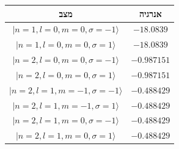 \begin{tabular}{c c}
מצב & אנרגיה \\
\hline
$|n=1, l=0, m=0, \sigma=-1\rangle$ & $-18.0839$ \\
$|n=1, l=0, m=0, \sigma=1\rangle$ & $-18.0839$ \\
$|n=2, l=0, m=0, \sigma=-1\rangle$ & $-0.987151$ \\
$|n=2, l=0, m=0, \sigma=1\rangle$ & $-0.987151$ \\
$|n=2, l=1, m=-1, \sigma=-1\rangle$ & $-0.488429$ \\
$|n=2, l=1, m=-1, \sigma=1\rangle$ & $-0.488429$ \\
$|n=2, l=1, m=0, \sigma=-1\rangle$ & $-0.488429$ \\
$|n=2, l=1, m=0, \sigma=1\rangle$ & $-0.488429$ \\
\end{tabular}
